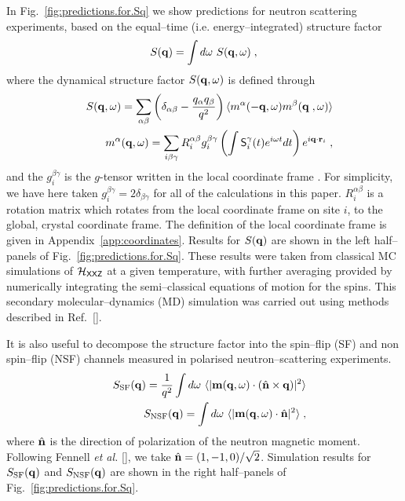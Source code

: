 \documentclass[apsrev4-1,prx,superscriptaddress,floatfix,twocolumn,longbibliography]{revtex4-1}
\begin{document}
\begin{appendix}
In Fig.~\ref{fig:predictions.for.Sq} we show predictions for  neutron scattering experiments,
based on the equal--time (i.e. energy--integrated) structure factor
%
\begin{equation}
  S({\bf q}) = \int d\omega\ S({\bf q},\omega)  \; ,
  \label{eq:S.q}
\end{equation}
%
where the dynamical structure factor $S({\bf q},\omega)$ is defined
through
%
\begin{eqnarray}
  &&S({\bf q},\omega) 
  =  \sum_{\alpha\beta} \left( 
\delta_{\alpha\beta}-\frac{q_\alpha q_\beta}{q^2}  \right) 
  \langle m^\alpha(-{\bf q},\omega) m^\beta({\bf q} \;,\omega) \rangle 
  \nonumber\\ 
&&m^\alpha({\bf q},\omega) 
  = \sum_{i \beta \gamma} R^{\alpha \beta}_i g^{\beta\gamma}_i  
  \left(\int  \mathsf{S}^\gamma_i(t) e^{i\omega t} dt\right)  e^{i {\bf q}\cdot {\bf r}_i} \;,
\end{eqnarray}
%
and the  $g^{\beta\gamma}_i$ 
is the $g$-tensor written in the local coordinate frame \cite{yan17}.
%
For simplicity, we have here taken 
$g^{\beta\gamma}_i = 2 \delta_{\beta\gamma}$ for all of 
the calculations in this paper.
%
$R^{\alpha\beta}_i$ is a rotation matrix which rotates
from the local coordinate frame on site $i$, to the global,
crystal coordinate frame.
%
The definition of the local coordinate frame is given in
Appendix~\ref{app:coordinates}.
%
Results for $S({\bf q})$ are shown in the left half--panels of Fig.~\ref{fig:predictions.for.Sq}.
%
These results were taken from classical MC simulations of
$\mathcal{H}_{\sf XXZ}$ at a given temperature, with further averaging
provided by numerically integrating the semi--classical equations of
motion for the spins.
%
This secondary molecular--dynamics (MD) simulation was carried out
using methods described in Ref.~[].


It is also useful to decompose the structure factor into the
spin--flip (SF) and non spin--flip (NSF) channels measured in
polarised neutron--scattering experiments.
%
\begin{eqnarray}
  \label{eq:S.5}
&&  S_{\text{SF}}({\bf q}) 
  = \frac{1}{q^2}\int d\omega\ \langle|{\bf m}({\bf q},\omega) 
      \cdot (\hat{\bf n}\times {\bf q})|^2\rangle 
\nonumber \\
&&  S_{\text{NSF}}({\bf q}) 
  = \int d\omega\ \langle|{\bf m}({\bf q},\omega) 
  \cdot \hat{\bf n}|^2\rangle \; ,
\end{eqnarray}
%
where $\hat{\bf n}$ is the direction of polarization of the neutron
magnetic moment.
%
Following Fennell {\it et al.} [], we take 
$\hat{\bf n} = (1,-1,0)/\sqrt{2}$.
%
Simulation results for $S_{\text{SF}}({\bf q})$ 
and $S_{\text{NSF}}({\bf q})$ 
are shown in the right half--panels of Fig.~\ref{fig:predictions.for.Sq}.


\end{appendix}
\end{document}
